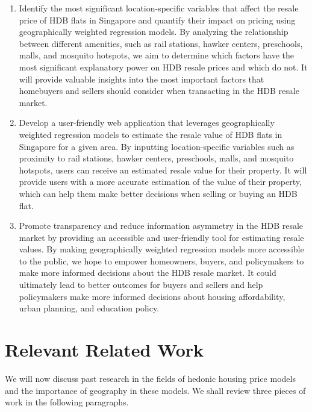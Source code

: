 \documentclass[manuscript,screen]{acmart}
\begin{document}
\begin{enumerate}
\def\labelenumi{\arabic{enumi}.}
\item
  Identify the most significant location-specific variables that affect
  the resale price of HDB flats in Singapore and quantify their impact
  on pricing using geographically weighted regression models. By
  analyzing the relationship between different amenities, such as rail
  stations, hawker centers, preschools, malls, and mosquito hotspots, we
  aim to determine which factors have the most significant explanatory
  power on HDB resale prices and which do not. It will provide valuable
  insights into the most important factors that homebuyers and sellers
  should consider when transacting in the HDB resale market.
\item
  Develop a user-friendly web application that leverages geographically
  weighted regression models to estimate the resale value of HDB flats
  in Singapore for a given area. By inputting location-specific
  variables such as proximity to rail stations, hawker centers,
  preschools, malls, and mosquito hotspots, users can receive an
  estimated resale value for their property. It will provide users with
  a more accurate estimation of the value of their property, which can
  help them make better decisions when selling or buying an HDB flat.
\item
  Promote transparency and reduce information asymmetry in the HDB
  resale market by providing an accessible and user-friendly tool for
  estimating resale values. By making geographically weighted regression
  models more accessible to the public, we hope to empower homeowners,
  buyers, and policymakers to make more informed decisions about the HDB
  resale market. It could ultimately lead to better outcomes for buyers
  and sellers and help policymakers make more informed decisions about
  housing affordability, urban planning, and education policy.
\end{enumerate}

\hypertarget{relevant-related-work}{%
\section{Relevant Related Work}\label{relevant-related-work}}

We will now discuss past research in the fields of hedonic housing price
models and the importance of geography in these models. We shall review
three pieces of work in the following paragraphs.
\end{document}
